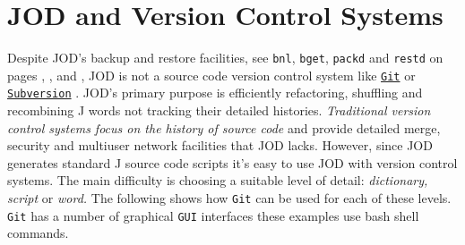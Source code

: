 \section{JOD and Version Control Systems}\label{ap:jodvcsys}

Despite JOD's backup and restore facilities, see \texttt{bnl}, \texttt{bget}, \texttt{packd} and
\texttt{restd} on pages \pageref{ss:bnl}, \pageref{ss:bget}, \pageref{ss:packd} and \pageref{ss:restd}, JOD is not 
a  source code version control system like \href{http://git-scm.com/}{\texttt{Git}} \cite{gitsite} or 
\href{http://subversion.tigris.org/}{\texttt{Subversion}} \cite{subvsite}. 
 JOD's primary
purpose is efficiently  refactoring, shuffling and recombining J words not tracking their detailed histories. 
\emph{Traditional version control systems focus on the history
of source code} and provide detailed  merge, security and multiuser network 
facilities that JOD  lacks.  However, since JOD generates
standard J source code scripts it's easy to use JOD with version control systems. 
The main difficulty is choosing a suitable level of detail: \emph{dictionary, script} or \emph{word.} 
The following shows how \texttt{Git} can be used for each of these levels. \texttt{Git} has
a number of graphical \texttt{GUI} interfaces these examples use bash shell commands.


